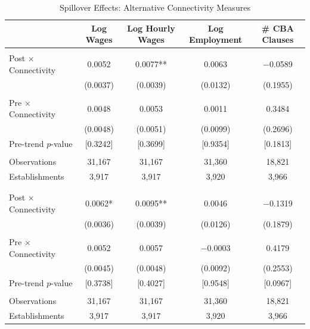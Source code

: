 \begin{table}[H]
\centering
\caption{Spillover Effects: Alternative Connectivity Measures}
\label{tab:rob_spill_alt_conn}
\scriptsize
\begin{threeparttable}
\begin{tabular}{lcccc}
\toprule\toprule
 & \textbf{Log Wages} & \textbf{Log Hourly Wages} & \textbf{Log Employment} & \textbf{\# CBA Clauses} \\
\midrule
{} \\
\midrule
Post $\times$ Connectivity & 0.0052 & 0.0077** & 0.0063 & $-$0.0589 \\
  & (0.0037) & (0.0039) & (0.0132) & (0.1955) \\
  &  &  &  & \\
Pre $\times$ Connectivity & 0.0048 & 0.0053 & 0.0011 & 0.3484 \\
  & (0.0048) & (0.0051) & (0.0099) & (0.2696) \\
Pre-trend $p$-value & [0.3242] & [0.3699] & [0.9354] & [0.1813] \\
  &  &  &  & \\
Observations & 31{,}167 & 31{,}167 & 31{,}360 & 18{,}821 \\
Establishments & 3{,}917 & 3{,}917 & 3{,}920 & 3{,}966 \\
  &  &  &  & \\
\midrule
{} \\
\midrule
Post $\times$ Connectivity & 0.0062* & 0.0095** & 0.0046 & $-$0.1319 \\
  & (0.0036) & (0.0039) & (0.0126) & (0.1879) \\
  &  &  &  & \\
Pre $\times$ Connectivity & 0.0052 & 0.0057 & $-$0.0003 & 0.4179 \\
  & (0.0045) & (0.0048) & (0.0092) & (0.2553) \\
Pre-trend $p$-value & [0.3738] & [0.4027] & [0.9548] & [0.0967] \\
  &  &  &  & \\
Observations & 31{,}167 & 31{,}167 & 31{,}360 & 18{,}821 \\
Establishments & 3{,}917 & 3{,}917 & 3{,}920 & 3{,}966 \\
\bottomrule
\end{tabular}

\end{threeparttable}
\end{table}
